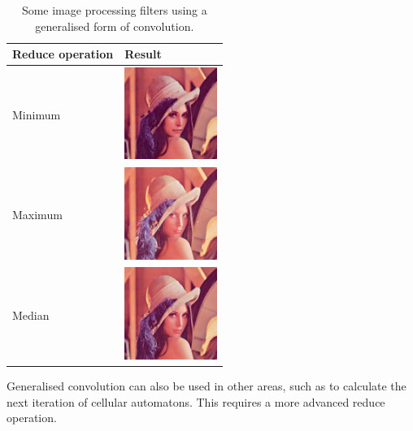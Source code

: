 \begin{table}
    \centering
    \begin{tabular}{lm{3cm}}
        Reduce operation & Result \\
        \hline
        Minimum & \includegraphics[width=3cm]{img/LenaMin} \\
        Maximum & \includegraphics[width=3cm]{img/LenaMax} \\
        Median & \includegraphics[width=3cm]{img/LenaMedian}
    \end{tabular}

    \caption{Some image processing filters using a generalised form of convolution.}
    \label{tab:GeneralisedKernelMatrices}
\end{table}

Generalised convolution can also be used in other areas, such as to calculate the next iteration of cellular automatons. This requires a more advanced reduce operation.
